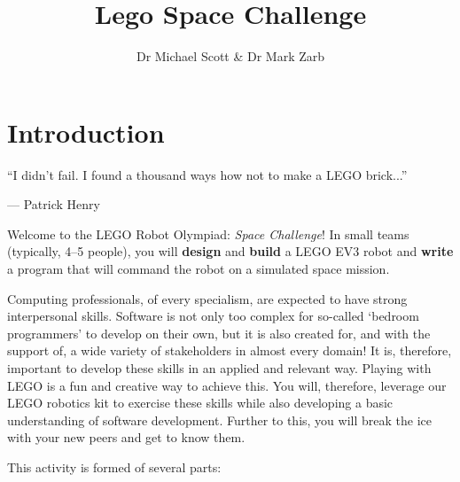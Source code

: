 \documentclass{fal_assignment}
\title{Lego Space Challenge}
\author{Dr Michael Scott \& Dr Mark Zarb}
\begin{document}
\maketitle

\section*{Introduction}

\begin{marginquote}
``I didn't fail. I found a thousand ways how not to make a LEGO brick...''
\par --- Patrick Henry
\end{marginquote}

Welcome to the LEGO Robot Olympiad: \textit{Space Challenge}! In small teams (typically, 4--5 people), you will \textbf{design} and \textbf{build} a LEGO EV3 robot and \textbf{write} a program that will command the robot on a simulated space mission.

Computing professionals, of every specialism, are expected to have strong interpersonal skills. Software is not only too complex for so-called `bedroom programmers' to develop on their own, but it is also created for, and with the support of, a wide variety of stakeholders in almost every domain! It is, therefore, important to develop these skills in an applied and relevant way. Playing with LEGO is a fun and creative way to achieve this. You will, therefore, leverage our LEGO robotics kit to exercise these skills while also developing a basic understanding of software development. Further to this, you will break the ice with your new peers and get to know them.

This activity is formed of several parts:
\end{document}
